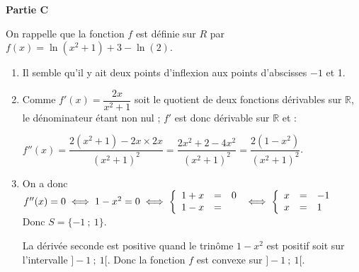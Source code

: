 \documentclass[10pt]{article}
\providecommand{\R}{\mathbb{R}}
\begin{document}
\bigskip

\textbf{Partie C}

\medskip

On rappelle que la fonction $f$ est définie sur $R$ par $f(x) = \ln \left(x^2 + 1\right) + 3 - \ln (2)$.

\medskip

\begin{enumerate}
\item 

Il semble qu'il y ait deux points d'inflexion aux points d'abscisses $- 1$ et 1.
\item 
Comme $f'(x) = \dfrac{2x}{x^2 + 1}$ soit le quotient de deux fonctions dérivables sur $\R$, le dénominateur étant non nul ; $f'$ est donc dérivable sur $\R$ et :

$f''(x) = \dfrac{2\left(x^2 + 1\right) - 2x \times 2x}{\left(x^2 + 1\right)^2} = \dfrac{2x^2 + 2 - 4x^2}{\left(x^2 + 1\right)^2} = \dfrac{2\left(1 - x^2\right)}{\left(x^2 + 1\right)^2}$.
\item 
On a donc $f''(x) = 0 \iff 1 - x^2 = 0 \iff \left\{\begin{array}{l c  l}
1 +x&=&0\\
1 - x&=&
\end{array}\right.\iff \left\{\begin{array}{l c l}
x&=&- 1\\
x&=&1
\end{array}\right.$ Donc $S = \{-1~;~1\}$.

La dérivée seconde est positive quand le trinôme $1 - x^2$ est positif soit sur l'intervalle $]-1~;~1[$. Donc la fonction $f$ est convexe sur $]-1~;~1[$.
\end{enumerate}
\end{document}
